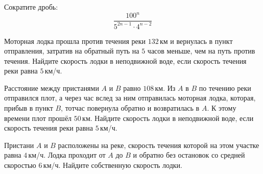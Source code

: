 \begin{homework}[number=2]
	\begin{listofex}
		\item Сократите дробь: \[\dfrac{100^n}{5^{2n-1}\cdot4^{n-2}}\]
		\item Моторная лодка прошла против течения реки \( 132 \) км и вернулась в пункт отправления, затратив на обратный путь на \( 5 \) часов меньше, чем на путь против течения. Найдите скорость лодки в неподвижной воде, если скорость течения реки равна \( 5 \) км/ч.
		\item Расстояние между пристанями \( A \) и \( B \) равно \( 108 \) км. Из \( A \) в \( B \) по течению реки отправился плот, а через час вслед за ним отправилась моторная лодка, которая, прибыв в пункт \( B \), тотчас повернула обратно и возвратилась в \( A \). К этому времени плот прошёл \( 50 \) км. Найдите скорость лодки в неподвижной воде, если скорость течения реки равна \( 5 \) км/ч.
		\item Пристани \( A \) и \( B \) расположены на реке, скорость течения которой на этом участке равна \( 4 \) км/ч. Лодка проходит от \( A \) до \( B \) и обратно без остановок со средней скоростью \( 6 \) км/ч. Найдите собственную скорость лодки.
	\end{listofex}
\end{homework}

